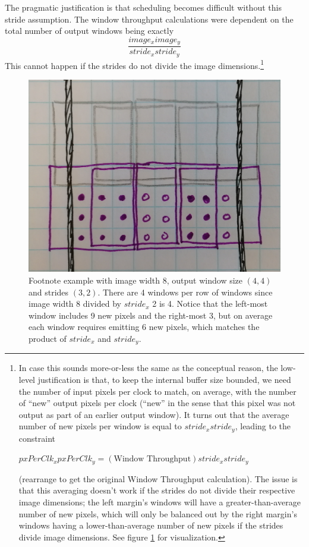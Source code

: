 \documentclass[12pt]{article}
\begin{document}
The pragmatic justification is that scheduling becomes difficult
without this stride assumption. The window throughput calculations
were dependent on the total number of output windows being exactly
\begin{equation}
\frac{image_x image_y}{stride_x stride_y}
\end{equation}
This cannot happen if the strides do not divide the image
dimensions.\footnote{ In case this sounds more-or-less the same as the
  conceptual reason, the low-level justification is that, to keep the
  internal buffer size bounded, we need the number of input pixels per
  clock to match, on average, with the number of ``new'' output pixels
  per clock (``new'' in the sense that this pixel was not output as
  part of an earlier output window). It turns out that the average
  number of new pixels per window is equal to $stride_x stride_y$,
  leading to the constraint
  
  $pxPerClk_x pxPerClk_y = (\text{Window Throughput})stride_x stride_y$
  
  (rearrange to get the original Window Throughput calculation).  The
  issue is that this averaging doesn't work if the strides do not
  divide their respective image dimensions; the left margin's windows
  will have a greater-than-average number of new pixels, which will
  only be balanced out by the right margin's windows having a
  lower-than-average number of new pixels if the strides divide image
  dimensions.  See figure \ref{footnote-rambling.jpg} for
  visualization.  }

\begin{figure}[bth!]
  \centering
  \includegraphics[width=0.6\linewidth]{Figures/footnote-rambling.jpg}
  \caption{Footnote example with image width 8, output window size
    $(4,4)$ and strides $(3,2)$. There are 4 windows per row of
    windows since image width 8 divided by $stride_x$ 2 is 4. Notice
    that the left-most window includes 9 new pixels and the right-most
    3, but on average each window requires emitting 6 new pixels,
    which matches the product of $stride_x$ and $stride_y$.}
  \label{footnote-rambling.jpg}
\end{figure}
\end{document}
